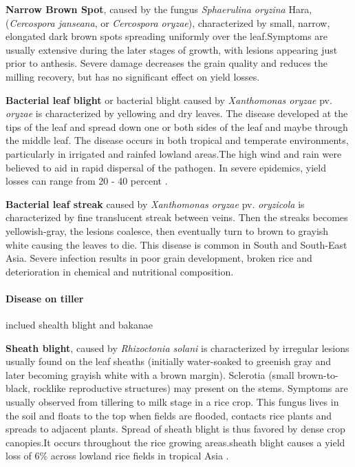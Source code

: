 \documentclass[12pt, oneside]{report}
\begin{document}
\textbf{Narrow Brown Spot}, caused by the fungus \textit{Sphaerulina oryzina} Hara, (\textit{Cercospora janseana}, or \textit{Cercospora oryzae}), characterized by small, narrow, elongated dark brown spots spreading uniformly over the leaf.Symptoms are usually extensive during the later stages of growth, with lesions appearing just prior to anthesis. Severe damage decreases the grain quality and reduces the milling recovery, but has no significant effect on yield losses.

\textbf{Bacterial leaf blight} or bacterial blight caused by \textit{Xanthomonas oryzae} pv. \textit{oryzae} is characterized by yellowing and dry leaves. The disease developed at the tips of the leaf and spread down one or both sides of the leaf and maybe through the middle leaf. The disease occurs in both tropical and temperate environments, particularly in irrigated and rainfed lowland areas.The high wind and rain were believed to aid in rapid dispersal of the pathogen. In severe epidemics, yield losses can range from 20 - 40 percent \citep{sonti1998bacterial, irrirkb}.

\textbf{Bacterial leaf streak} caused by \textit{Xanthomonas oryzae} pv. \textit{oryzicola} is characterized by fine translucent streak between veins. Then the streaks becomes yellowish-gray, the lesions coalesce, then eventually turn to brown to grayish white causing the leaves to die. This disease is common in South and South-East Asia. Severe infection results in poor grain development, broken rice and deterioration in chemical and nutritional composition.

\paragraph{Disease on tiller} inclued shealth blight and bakanae

 \textbf{Sheath blight}, caused by \textit{Rhizoctonia solani} is characterized by irregular lesions usually found on the leaf sheaths (initially water-soaked to greenish gray and later becoming grayish white with a brown margin). Sclerotia (small brown-to-black, rocklike reproductive structures) may present on the stems. Symptoms are usually observed from tillering to milk stage in a rice crop. This fungus lives in the soil and floats to the top when fields are flooded, contacts rice plants and spreads to adjacent plants. Spread of sheath blight is thus favored by dense crop canopies.It occurs throughout the rice growing areas.sheath blight causes a yield loss of 6\% across lowland rice fields in tropical Asia \cite{Savary:2006to}. 
\end{document}
